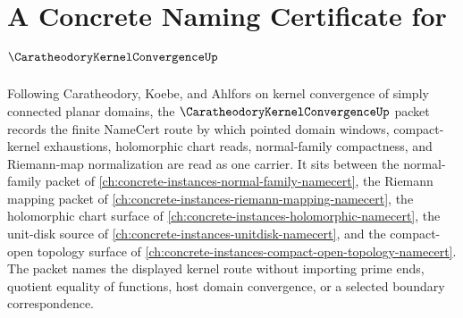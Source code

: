 \chapter{A Concrete Naming Certificate for $\CaratheodoryKernelConvergenceUp$}
\label{ch:concrete-instances-caratheodory-kernel-convergence-namecert}

Following Caratheodory, Koebe, and Ahlfors on kernel convergence of simply connected planar domains, the $\CaratheodoryKernelConvergenceUp$ packet records the finite NameCert route by which pointed domain windows, compact-kernel exhaustions, holomorphic chart reads, normal-family compactness, and Riemann-map normalization are read as one carrier. It sits between the normal-family packet of \autoref{ch:concrete-instances-normal-family-namecert}, the Riemann mapping packet of \autoref{ch:concrete-instances-riemann-mapping-namecert}, the holomorphic chart surface of \autoref{ch:concrete-instances-holomorphic-namecert}, the unit-disk source of \autoref{ch:concrete-instances-unitdisk-namecert}, and the compact-open topology surface of \autoref{ch:concrete-instances-compact-open-topology-namecert}. The packet names the displayed kernel route without importing prime ends, quotient equality of functions, host domain convergence, or a selected boundary correspondence.

